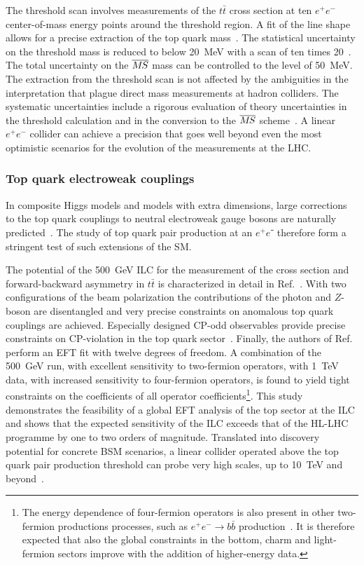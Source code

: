 The threshold scan involves measurements of the $t\bar{t}$ cross section at ten $e^+e^-$
center-of-mass energy points around the threshold region. A fit of the line shape allows for
a precise extraction of the top quark mass~\cite{Martinez:2002st,Horiguchi:2013wra,Seidel:2013sqa}.
The statistical uncertainty on the threshold mass is reduced to below 20~MeV with a scan of
ten times 20~\ifb. The total uncertainty on the $\msb$ mass can be controlled to the level
of 50~MeV. The extraction from the threshold scan is not affected by the ambiguities in the
interpretation that plague direct mass measurements at hadron colliders. The systematic uncertainties
include a rigorous evaluation of theory uncertainties in the threshold calculation and in the conversion
to the $\msb$ scheme~\cite{Simon:2016pwp}. A linear $e^+e^-$ collider can achieve a precision that goes well beyond
even the most optimistic scenarios for the evolution of the measurements at the LHC.


\subsubsection{Top quark electroweak couplings}
\label{subsubsec:highE:topelectroweak}

In composite Higgs models and models with extra dimensions, large corrections to the top quark couplings to
neutral electroweak gauge bosons are naturally predicted~\cite{Richard:2014upa,Barducci:2015aoa,Durieux:2018ekg}.
The study of top quark pair production at an $e^+e⁻$ therefore form a stringent test of such extensions of the SM.

The potential of the 500~GeV{} ILC for the measurement of the cross section and forward-backward asymmetry in
$t\bar{t}$ is characterized in detail in Ref.~\cite{Amjad:2015mma}. With two configurations of the beam polarization
the contributions of the photon and $Z$-boson are disentangled and very precise constraints on anomalous top quark
couplings are achieved. Especially designed CP-odd observables provide precise constraints on CP-violation in the
top quark sector~\cite{Bernreuther:2017cyi}. Finally, the authors of Ref.~\cite{Durieux:2018tev} perform an EFT fit
with twelve degrees of freedom. A combination of the 500~GeV run, with excellent sensitivity to two-fermion operators,
with 1~TeV{} data, with increased sensitivity to four-fermion operators, is found to yield tight constraints on the
coefficients of all operator coefficients\footnote{The energy dependence of four-fermion operators is also present in
other two-fermion productions processes, such as $e^+e^- \rightarrow b\bar{b}$ production~\cite{Bilokin:2017lco}. It is
therefore expected that also the global constraints in the bottom, charm and light-fermion sectors improve with the addition
of higher-energy data.}. This study demonstrates the feasibility of a global EFT analysis of the top sector
at the ILC and shows that the expected sensitivity of the ILC exceeds that of the HL-LHC programme by one to two orders of
magnitude. Translated into discovery potential for concrete BSM scenarios, a linear collider operated above the top quark
pair production threshold can probe very high scales, up to 10~TeV and beyond~\cite{Durieux:2018ekg}. 

